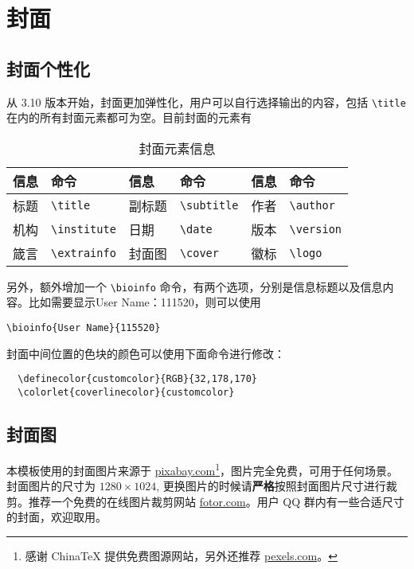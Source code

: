 \documentclass[cn,10pt,math=newtx,citestyle=gb7714-2015,bibstyle=gb7714-2015]{elegantbook}
\begin{document}
\section{封面}

\subsection{封面个性化}

从 3.10 版本开始，封面更加弹性化，用户可以自行选择输出的内容，包括 \lstinline{\title} 在内的所有封面元素都可为空。目前封面的元素有

\begin{table}[htbp]
  \centering
  \caption{封面元素信息}
  \begin{tabular}{p{}p{}|p{}p{}|p{}p{}}
    \toprule
    信息 & 命令 & 信息 & 命令 & 信息 & 命令 \\
    \midrule
    标题 & \lstinline|\title| & 副标题 & \lstinline|\subtitle| & 作者 & \lstinline|\author| \\
    机构 & \lstinline|\institute| & 日期 &  \lstinline|\date| & 版本 & \lstinline|\version| \\
    箴言 & \lstinline|\extrainfo| & 封面图 & \lstinline|\cover| & 徽标 & \lstinline|\logo| \\
    \bottomrule
  \end{tabular}
\end{table}

另外，额外增加一个 \lstinline{\bioinfo} 命令，有两个选项，分别是信息标题以及信息内容。比如需要显示{\kaishu User Name：111520}，则可以使用 
\begin{lstlisting}
\bioinfo{User Name}{115520}
\end{lstlisting}

封面中间位置的色块的颜色可以使用下面命令进行修改：
\begin{lstlisting}
  \definecolor{customcolor}{RGB}{32,178,170}
  \colorlet{coverlinecolor}{customcolor}
\end{lstlisting}

\subsection{封面图}

本模板使用的封面图片来源于 \href{https://pixabay.com/en/tea-time-poetry-coffee-reading-3240766/}{pixabay.com}\footnote{感谢 China\TeX{} 提供免费图源网站，另外还推荐 \href{https://www.pexels.com/}{pexels.com}。}，图片完全免费，可用于任何场景。封面图片的尺寸为 $1280 \times 1024$, 更换图片的时候请\textbf{严格}按照封面图片尺寸进行裁剪。推荐一个免费的在线图片裁剪网站 \href{https://www.fotor.com/cn}{fotor.com}。用户 QQ 群内有一些合适尺寸的封面，欢迎取用。
\end{document}
